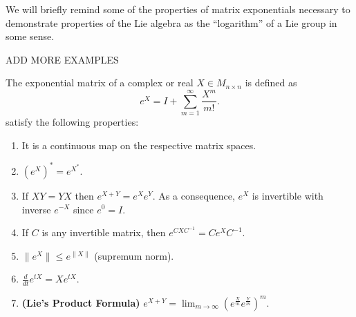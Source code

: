 	We will briefly remind some of the properties of matrix exponentials necessary to demonstrate properties of the Lie algebra as the “logarithm” of a Lie group in some sense.
\begin{ex}
	ADD MORE EXAMPLES \label{11EXAMPLES}
\end{ex}
\begin{prop}
	The exponential matrix of a complex or real $X \in M_{n\times n}$ is defined as 
	$$e^X = I + \sum_{m=1}^\infty \frac{X^m}{m!}.$$
	satisfy the following properties:
	\begin{enumerate}[label=(\alph*)]
		\item It is a continuous map on the respective matrix spaces.
		\item $(e^X)^*=e^{X^*}$.
		\item If $XY=YX$ then $e^{X+Y}=e^Xe^Y$. As a consequence, $e^X$ is invertible with inverse $e^{-X}$ since $e^0=I$.
		\item If $C$ is any invertible matrix, then $e^{CXC^{-1}}=Ce^XC^{-1}$.
		\item $\|e^X\|\le e^{\|X\|}$ (supremum norm).
		\item $\frac{d}{dt}e^{tX} = Xe^{tX}$.
		\item \textbf{(Lie's Product Formula)} $e^{X+Y} = \displaystyle\lim_{m \rightarrow \infty} (e^{\frac{X}{m}}e^{\frac{Y}{m}})^m$.
	\end{enumerate}
	\label{MatrixExponential}
\end{prop}

